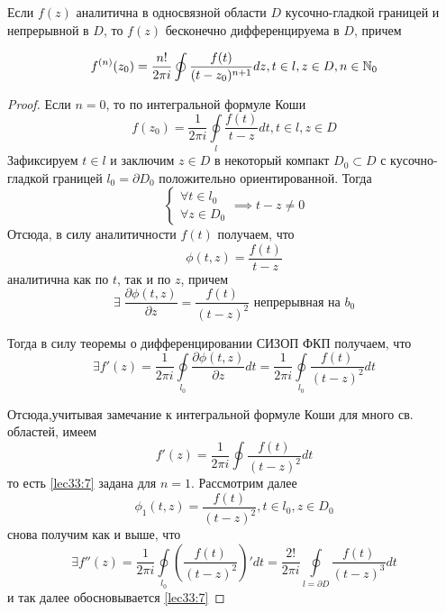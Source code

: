 \documentclass[../../main.tex]{subfiles}
\begin{document}
	
	\begin{thm}
        Если $f(z)$ аналитична в односвязной области $D$ 
        кусочно-гладкой границей и непрерывной в $D$, то 
        $f(z)$ бесконечно дифференцируема в $D$, причем 
        
        \begin{equation}
            \label{lec33:7}
            f^{(n)}(z_0) = \frac{n!}{2\pi i} \oint
            \frac{f(t)}{(t-z_0)^{n+1}} dz,
            t \in l, z \in D, n \in \mathbb{N}_0
        \end{equation}
        
	\end{thm}
	
	\begin{proof}
        Если $n=0$, то по интегральной формуле Коши
        \[
            f(z_0) = \frac{1}{2\pi i} \oint \limits_l
            \frac{f(t)}{t-z} dt, t \in l, z \in D
        \]
        Зафиксируем $t \in l$ и заключим $z \in D$ в
        некоторый компакт $D_0 \subset D$ с 
        кусочно-гладкой границей $l_0 = \partial D_0$
        положительно ориентированной. Тогда
        \[
         \begin{cases}
          \forall t \in l_0 \\
          \forall z \in D_0
         \end{cases} \implies t - z \neq 0
        \]
        Отсюда, в силу аналитичности $f(t)$ получаем, что
        \begin{equation}
         \label{lec33:9}
         \phi(t, z) = \frac{f(t)}{t-z} 
        \end{equation}
        аналитична как по $t$, так и по $z$, причем
        \[
            \exists\; \frac{\partial \phi(t, z)}{\partial z}
            = \frac{f(t)}{(t-z)^2}
            \text{ непрерывная на } b_0
        \]
        
        Тогда в силу теоремы о дифференцировании СИЗОП ФКП
        получаем, что 
        \begin{equation}
         \label{lec33:10}
         \exists f'(z) = \frac{1}{2\pi i} \oint\limits_{l_0}
         \frac{\partial \phi(t, z)}{\partial z} dt = 
         \frac{1}{2\pi i} \oint\limits_{l_0}\frac{f(t)}{(t-z)^2} 
         dt 
        \end{equation}
        
        Отсюда,учитывая замечание к интегральной формуле Коши 
        для много св. областей, имеем 
        \[
         f'(z) = \frac{1}{2\pi i} \oint \frac{f(t)}{(t-z)^2} dt
        \]
        то есть \eqref{lec33:7} задана для $n = 1$.
        Рассмотрим далее 
        \[
         \phi_1(t, z) = \frac{f(t)}{(t-z)^2}, t \in l_0,
         z \in D_0
        \]
        снова получим как и выше, что 
        \[
         \exists f''(z) = \frac{1}{2\pi i} \oint\limits_{l_0}
         \left( \frac{f(t)}{(t-z)^2} \right)' dt =
          \frac{2!}{2\pi i} \oint\limits_{l = \partial D}
          \frac{f(t)}{(t-z)^3} dt 
        \]
        и так далее обосновывается \eqref{lec33:7}
	\end{proof}
\end{document}
